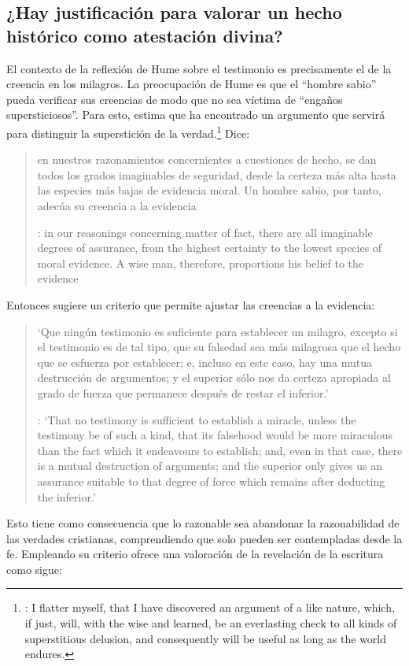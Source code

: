 \subsection{¿Hay justificación para valorar un hecho histórico como
  atestación divina?}
El contexto de la reflexión de Hume sobre el testimonio es precisamente el de la
creencia en los milagros. La preocupación de Hume es que el \enquote{hombre
  sabio} pueda verificar sus creencias de modo que no sea víctima de
\enquote{engaños supersticiosos}. Para esto, estima que ha encontrado un
argumento que servirá para distinguir la superstición de la
verdad.\footnote{\cite[Cf.~][\S10,1. 73]{hume1777enquiry}: I flatter myself,
  that I have discovered an argument of a like nature, which, if just, will,
  with the wise and learned, be an everlasting check to all kinds of
  superstitious delusion, and consequently will be useful as long as the world
  endures.} Dice:

\blockquote[{\cite[\S10,1. 73]{hume1777enquiry}}: in our reasonings concerning
matter of fact, there are all imaginable degrees of assurance, from the highest
certainty to the lowest species of moral evidence. A wise man, therefore,
proportions his belief to the evidence]{en nuestros razonamientos concernientes
  a cuestiones de hecho, se dan todos los grados imaginables de seguridad, desde la
  certeza más alta hasta las especies más bajas de evidencia moral. Un hombre
  sabio, por tanto, adecúa su creencia a la evidencia}.

Entonces sugiere un criterio que permite ajustar las creencias
a la evidencia:

\blockquote[{\cite[\S10,1. 77]{hume1777enquiry}}: `That no testimony is
sufficient to establish a miracle, unless the testimony be of such a kind, that
its falsehood would be more miraculous than the fact which it endeavours to
establish; and, even in that case, there is a mutual destruction of arguments;
and the superior only gives us an assurance suitable to that degree of force
which remains after deducting the inferior.']{`Que ningún testimonio es
  suficiente para establecer un milagro, excepto si el testimonio es de tal
  tipo, que su falsedad sea más milagrosa que el hecho que se esfuerza por
  establecer; e, incluso en este caso, hay una mutua destrucción de argumentos;
  y el superior sólo nos da certeza apropiada al grado de fuerza que permanece
  después de restar el inferior.'}

Esto tiene como consecuencia que lo razonable sea abandonar la razonabilidad de
las verdades cristianas, comprendiendo que solo pueden ser contempladas desde la
fe. Empleando su criterio ofrece una valoración de la revelación de la escritura
como sigue:

